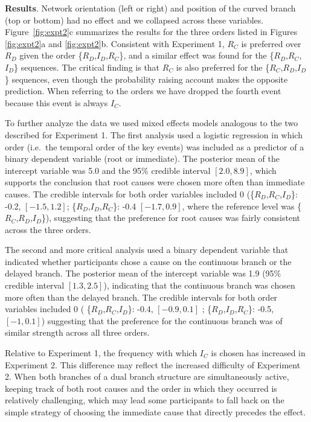 \documentclass[10pt,letterpaper]{article}
\newcommand{\ev}[2]{$#1_#2$}
\begin{document}
\textbf{Results}.  
Network orientation (left or right) and position of the curved branch (top or bottom) had no effect and we collapsed across these variables.  Figure~\ref{fig:expt2}c summarizes the results for the three orders listed in Figures \ref{fig:expt2}a and \ref{fig:expt2}b.  Consistent with Experiment 1,  \ev{R}{C} is preferred over \ev{R}{D} given the order \{\ev{R}{D},\ev{I}{D},\ev{R}{C}\}, and a similar effect was found for the \{\ev{R}{D},\ev{R}{C},\ev{I}{D}\} sequences. The critical finding is that \ev{R}{C} is also preferred for the \{\ev{R}{C},\ev{R}{D},\ev{I}{D}\} sequences, even though the probability raising account makes the opposite prediction. When referring to the orders we have dropped the fourth event because this event is always \ev{I}{C}.

To further analyze the data we used mixed effects models analogous to the two described for Experiment 1. The first analysis used a logistic regression in which order (i.e.\ the temporal order of the key events) was included as a predictor of a binary dependent variable (root or immediate).  The posterior mean of the intercept variable was 5.0 and the 95\% credible interval $[2.0, 8.9]$, which supports the conclusion that root causes were chosen more often than immediate causes. The credible intervals for both order variables included 0 (\{\ev{R}{D},\ev{R}{C},\ev{I}{D}\}: -0.2, $[-1.5,1.2]$; \{\ev{R}{D},\ev{I}{D},\ev{R}{C}\}: -0.4 $[-1.7,0.9]$, where the reference level was \{\ev{R}{C},\ev{R}{D},\ev{I}{D}\}), suggesting that the preference for root causes was fairly consistent across the three orders.

The second and more critical analysis used a binary dependent variable that indicated whether participants chose a cause on the continuous branch or the delayed branch.  The posterior mean of the intercept variable was 1.9 (95\% credible interval $[1.3, 2.5]$), indicating that the continuous branch was chosen more often than the delayed branch.  The credible intervals for both order variables included 0 ( \{\ev{R}{D},\ev{R}{C},\ev{I}{D}\}: -0.4, $[-0.9,0.1]$ ; \{\ev{R}{D},\ev{I}{D},\ev{R}{C}\}: -0.5, $[-1,0.1]$) suggesting that the preference for the continuous branch was of similar strength across all three orders. 

Relative to Experiment 1, the frequency with which \ev{I}{C} is chosen has increased in Experiment 2. This difference may reflect the increased difficulty of Experiment 2. When both branches of a dual branch structure are simultaneously active, keeping track of both root causes and the order in which they occurred is relatively challenging, which may lead some participants to fall back on the simple strategy of choosing the immediate cause that directly precedes the effect.
\end{document}
